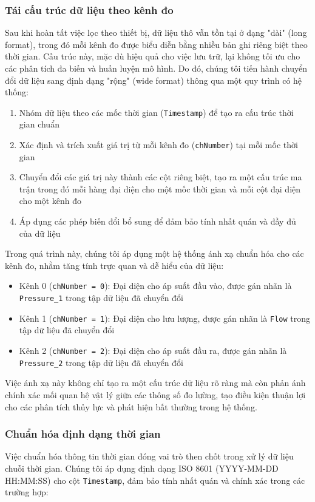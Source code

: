 \subsubsection{Tái cấu trúc dữ liệu theo kênh đo}
Sau khi hoàn tất việc lọc theo thiết bị, dữ liệu thô vẫn tồn tại ở dạng "dài" (long format), trong đó mỗi kênh đo được biểu diễn bằng nhiều bản ghi riêng biệt theo thời gian. Cấu trúc này, mặc dù hiệu quả cho việc lưu trữ, lại không tối ưu cho các phân tích đa biến và huấn luyện mô hình. Do đó, chúng tôi tiến hành chuyển đổi dữ liệu sang định dạng "rộng" (wide format) thông qua một quy trình có hệ thống:

\begin{enumerate}
    \item Nhóm dữ liệu theo các mốc thời gian (\texttt{Timestamp}) để tạo ra cấu trúc thời gian chuẩn
    \item Xác định và trích xuất giá trị từ mỗi kênh đo (\texttt{chNumber}) tại mỗi mốc thời gian
    \item Chuyển đổi các giá trị này thành các cột riêng biệt, tạo ra một cấu trúc ma trận trong đó mỗi hàng đại diện cho một mốc thời gian và mỗi cột đại diện cho một kênh đo
    \item Áp dụng các phép biến đổi bổ sung để đảm bảo tính nhất quán và đầy đủ của dữ liệu
\end{enumerate}

Trong quá trình này, chúng tôi áp dụng một hệ thống ánh xạ chuẩn hóa cho các kênh đo, nhằm tăng tính trực quan và dễ hiểu của dữ liệu:

\begin{itemize}
    \item Kênh 0 (\texttt{chNumber = 0}): Đại diện cho áp suất đầu vào, được gán nhãn là \texttt{Pressure\_1} trong tập dữ liệu đã chuyển đổi
    \item Kênh 1 (\texttt{chNumber = 1}): Đại diện cho lưu lượng, được gán nhãn là \texttt{Flow} trong tập dữ liệu đã chuyển đổi
    \item Kênh 2 (\texttt{chNumber = 2}): Đại diện cho áp suất đầu ra, được gán nhãn là \texttt{Pressure\_2} trong tập dữ liệu đã chuyển đổi
\end{itemize}

Việc ánh xạ này không chỉ tạo ra một cấu trúc dữ liệu rõ ràng mà còn phản ánh chính xác mối quan hệ vật lý giữa các thông số đo lường, tạo điều kiện thuận lợi cho các phân tích thủy lực và phát hiện bất thường trong hệ thống.

\subsubsection{Chuẩn hóa định dạng thời gian}
Việc chuẩn hóa thông tin thời gian đóng vai trò then chốt trong xử lý dữ liệu chuỗi thời gian. Chúng tôi áp dụng định dạng ISO 8601 (YYYY-MM-DD HH:MM:SS) cho cột \texttt{Timestamp}, đảm bảo tính nhất quán và chính xác trong các trường hợp:

